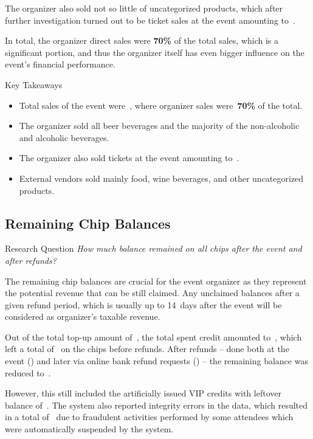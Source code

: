The organizer also sold not so little of uncategorized products, which after further investigation turned out to be ticket sales at the event amounting to~.

In total, the organizer direct sales were \textbf{70\%} of the total sales, which is a significant portion, and thus the organizer itself has even bigger influence on the event's financial performance.

\begin{blue-box}{Key Takeaways}
	\begin{itemize}
		\item Total sales of the event were~, where organizer sales were~\textbf{70\%} of the total.
		\item The organizer sold all beer beverages and the majority of the non-alcoholic and alcoholic beverages.
		\item The organizer also sold tickets at the event amounting to~.
		\item External vendors sold mainly food, wine beverages, and other uncategorized products.
	\end{itemize}
\end{blue-box}

\subsection{Remaining Chip Balances}
\label{subsec:analysis-remaining-balances}
\begin{gray-box}{Research Question}
	\textit{How much balance remained on all chips after the event and after refunds?}
\end{gray-box}

The remaining chip balances are crucial for the event organizer as they represent the potential revenue that can be still claimed.
Any unclaimed balances after a given refund period, which is usually up to 14~days after the event will be considered as organizer's taxable revenue.

Out of the total top-up amount of~, the total spent credit amounted to~, which left a total of~ on the chips before refunds.
After refunds – done both at the event () and later via online bank refund requests () – the remaining balance was reduced to~.

However, this still included the artificially issued VIP credits with leftover balance of~.
The system also reported integrity errors in the data, which resulted in a total of~ due to fraudulent activities performed by some attendees which were automatically suspended by the system.

